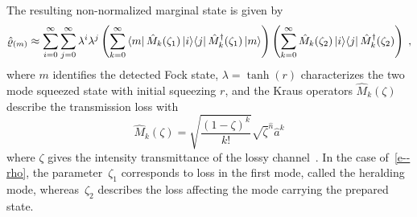 \documentclass{article}
\begin{document}
The resulting non-normalized marginal state is given by
%
\begin{equation}\label{e--rho}
  \hatrho_{(m)} \approx
  \sum_{i = 0}^{\infty} 
  \sum_{j = 0}^{\infty}
    \lambda^{i} \lambda^{j}
    \left(
      \sum_{k = 0}^{\infty}
        \bra{m} \hat{M}_{k} (\zeta_{1}) \ketbra{i}{j} \hat{M}_{k}^{\dagger} (\zeta_{1}) \ket{m}
    \right)
    \left(
      \sum_{k = 0}^{\infty}
        \hat{M}_{k}(\zeta_{2}) \ketbra{i}{j} \hat{M}_{k}^{\dagger} (\zeta_{2})
    \right) \Qc
\end{equation}
%
where $m$ identifies the detected Fock state, $\lambda = \tanh(r)$ characterizes the two mode squeezed state with initial squeezing $r$, and the Kraus operators $\hat{M}_{k} (\zeta) $ describe the transmission loss with
%
\begin{equation}
  \hat{M}_{k} (\zeta) =
    \sqrt{ \frac{(1 - \zeta)^{k}}{k!} } 
    \sqrt{\zeta}^{\hat{n}} \hat{a}^{k}
\end{equation}
%
where $\zeta$ gives the intensity transmittance of the lossy channel~\cite{ivan2011}. In the case of~\eqref{e--rho}, the parameter~$\zeta_{1}$ corresponds to loss in the first mode, called the heralding mode, whereas~$\zeta_{2}$ describes the loss affecting the mode carrying the prepared state.
\end{document}
